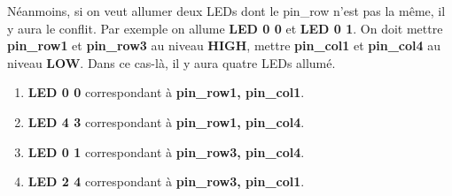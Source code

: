 \documentclass[14px]{article}
\begin{document}
Néanmoins, si on veut allumer deux LEDs dont le pin\_row n'est pas la même, il y aura le conflit. Par exemple on allume \textbf{LED 0 0} et \textbf{LED 0 1}. On doit mettre \textbf{pin\_row1} et \textbf{pin\_row3} au niveau \textbf{HIGH}, mettre \textbf{pin\_col1} et \textbf{pin\_col4} au niveau \textbf{LOW}. Dans ce cas-là, il y aura quatre LEDs allumé.
\begin{enumerate}
	\item \textbf{LED 0 0} correspondant à \textbf{pin\_row1, pin\_col1}.
	\item \textbf{LED 4 3} correspondant à \textbf{pin\_row1, pin\_col4}.
	\item \textbf{LED 0 1} correspondant à \textbf{pin\_row3, pin\_col4}.
	\item \textbf{LED 2 4} correspondant à \textbf{pin\_row3, pin\_col1}.
\end{enumerate}
\begin{figure}[htbp]
\end{figure}
\end{document}
